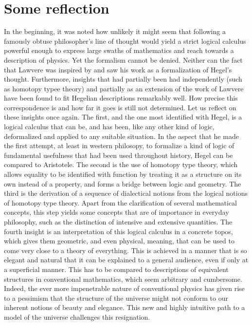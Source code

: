 \documentclass{article}
\begin{document}
\section{Some reflection}
In the beginning, it was noted how unlikely it might seem that following a famously obtuse philosopher's line of thought would yield a strict logical calculus powerful enough to express large swaths of mathematics and reach towards a description of physics. Yet the formalism cannot be denied. Neither can the fact that Lawvere was inspired by and saw his work as a formalization of Hegel's thought. Furthermore, insights that had partially been had independently (such as homotopy typee theory) and partially as an extension of the work of Lawvere have been found to fit Hegelian descriptions remarkably well. How precise this correspondence is and how far it goes is still not determined. Let us reflect on these insights once again. The first, and the one most identified with Hegel, is a logical calculus that can be, and has been, like any other kind of logic, deformalized and applied to any suitable situation. In the aspect that he made the first attempt, at least in western philosopy, to formalize a kind of logic of fundamental usefulness that had been used throughout history, Hegel can be compared to Aristotele. The second is the use of homotopy type theory, which allows equality to be identified with function by treating it as a structure on its own instead of a property, and forms a bridge between logic and geometry. The third is the derivation of a sequence of dialectical notions from the logical notions of homotopy type theory. Apart from the clarification of several mathematical concepts, this step yields some concepts that are of importance in everyday philosophy, such as the distinction of intensive and extensive quantities. The fourth insight is an interpretation of this logical calculus in a concrete topos, which gives them geometric, and even physical, meaning, that can be used to come very close to a theory of everything. This is achieved in a manner that is so elegant and natural that it can be explained to a general audience, even if only at a superficial manner. This has to be compared to descriptions of equivalent structures in conventional mathematics, which seem arbitrary and cumbersome. Indeed, the ever more impenetrable nature of conventional physics has given rise to a pessimism that the structure of the universe might not conform to our inherent notions of beauty and elegance. This new and highly intuitive path to a model of the universe challenges this resignation. \\
\end{document}

